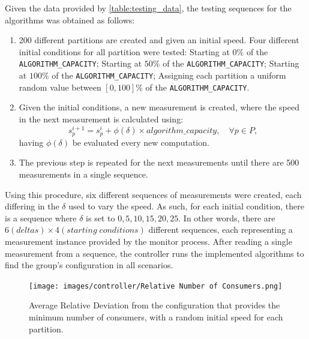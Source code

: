 Given the data provided by \ref{table:testing_data}, the testing sequences for
the algorithms was obtained as follows: \begin{enumerate} \item 200 different
            partitions are created and given an initial speed. Four different
            initial conditions for all partition were tested: Starting at $0\%$
            of the \lstinline[language=Python]{ALGORITHM_CAPACITY}; Starting at
            $50\%$ of the \lstinline[language=Python]{ALGORITHM_CAPACITY};
            Starting at $100\%$ of the
            \lstinline[language=Python]{ALGORITHM_CAPACITY}; Assigning each
            partition a uniform random value between $[0, 100]\%$ of the
            \lstinline[language=Python]{ALGORITHM_CAPACITY}.
    
    \item Given the initial conditions, a new measurement is created, where the
        speed in the next measurement is calculated using: \begin{equation}
        s_p^{i+1} = s_p^i + \phi(\delta) \times algorithm\_capacity, \quad
        \forall p \in P, \end{equation} having $\phi(\delta)$ be evaluated every
        new computation.
    
    \item The previous step is repeated for the next measurements until there
are 500 measurements in a single sequence.  \end{enumerate}

Using this procedure, six different sequences of measurements were created, each
    differing in the $\delta$ used to vary the speed. As such, for each initial
    condition, there is a sequence where $\delta$ is set to $0, 5, 10, 15, 20,
    25$. In other words, there are $6 (deltas) \times 4 (starting\; conditions)$
    different sequences, each representing a measurement instance provided by
    the monitor process. After reading a single measurement from a sequence, the
    controller runs the implemented algorithms to find the group's configuration
    in all scenarios.

\begin{figure}[H] \centering
    \texttt{[image: images/controller/Relative Number of
    Consumers.png]} \caption{Average Relative Deviation from the configuration
    that provides the minimum number of consumers, with a random initial speed
    for each partition.} \label{fig:relative_nconsumers} \end{figure}


